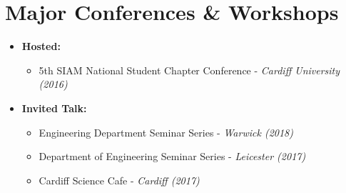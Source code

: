 \documentclass[10pt,a4paper,sans]{moderncv}        %
\begin{document}
	\section{Major Conferences \& Workshops}
	
	\vspace{6pt}
	
	\begin{itemize}
		
		\item{\textbf{Hosted:} 
			\small{
				\begin{itemize}
					\vspace{3pt}
					\item 5th SIAM National Student Chapter Conference - \textit{Cardiff University (2016)}
		\end{itemize}}}
		
		\vspace{6pt}
		
		\item{\textbf{Invited Talk:}
			
			\small{
				\begin{itemize}
					\vspace{3pt}
					\item Engineering Department Seminar Series - \textit{Warwick (2018)}
					\vspace{3pt}
					\item Department of Engineering Seminar Series - \textit{Leicester (2017)}
					\vspace{3pt}
					\item Cardiff Science Cafe - \textit{Cardiff (2017)}
		\end{itemize}}}
		
		\vspace{6pt}
		

\end{itemize}
\end{document}
